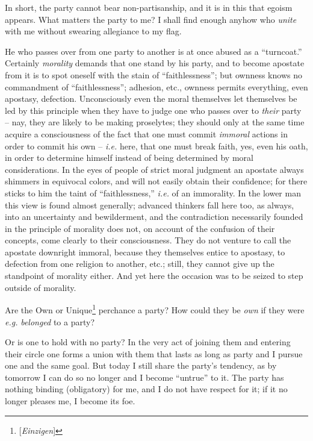 \documentclass[12pt,a4paper]{book}
\begin{document}
In short, the party cannot bear non-partisanship, and it is in this that 
egoism appears. What matters the party to me? I shall find enough anyhow who 
\textit{unite} with me without swearing allegiance to my flag.

He who passes over from one party to another is at once abused as a 
``turncoat.'' Certainly \textit{morality} demands that one stand by his 
party, and to become apostate from it is to spot oneself with the stain of 
``faithlessness''; but ownness knows no commandment of ``faithlessness''; 
adhesion, etc., ownness permits everything, even apostasy, defection. 
Unconsciously even the moral themselves let themselves be led by this 
principle when they have to judge one who passes over to \textit{their} party 
-- nay, they are likely to be making proselytes; they should only at the same 
time acquire a consciousness of the fact that one must commit \textit{immoral} 
actions in order to commit his own -- \textit{i.e.} here, that one must break 
faith, yes, even his oath, in order to determine himself instead of being 
determined by moral considerations. In the eyes of people of strict moral 
judgment an apostate always shimmers in equivocal colors, and will not easily 
obtain their confidence; for there sticks to him the taint of 
``faithlessness,'' \textit{i.e.} of an immorality. In the lower man this 
view is found almost generally; advanced thinkers fall here too, as always, 
into an uncertainty and bewilderment, and the contradiction necessarily 
founded in the principle of morality does not, on account of the confusion of 
their concepts, come clearly to their consciousness. They do not venture to 
call the apostate downright immoral, because they themselves entice to 
apostasy, to defection from one religion to another, etc.; still, they cannot 
give up the standpoint of morality either. And yet here the occasion was to be 
seized to step outside of morality.

Are the Own or Unique\footnote{[\textit{Einzigen}]} perchance a party? How 
could they be \textit{own} if they were \textit{e.g.} \textit{belonged} to a 
party?

Or is one to hold with no party? In the very act of joining them and entering 
their circle one forms a union with them that lasts as long as party and I 
pursue one and the same goal. But today I still share the party's tendency, as 
by tomorrow I can do so no longer and I become ``untrue'' to it. The party 
has nothing binding (obligatory) for me, and I do not have respect for it; if 
it no longer pleases me, I become its foe.
\end{document}
